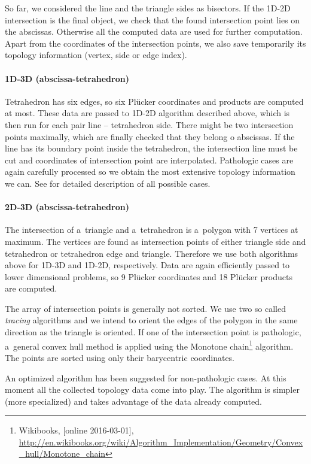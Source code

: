 \documentclass[FM,Dis]{tulthesis}
\begin{document}
So far, we considered the line and the triangle sides as bisectors. If the 1D-2D intersection is the final object,
we check that the found intersection point lies on the abscissas. Otherwise all the computed data are used for 
further computation. Apart from the coordinates of the intersection points, we also save temporarily its topology
information (vertex, side or edge index).

\paragraph{1D-3D (abscissa-tetrahedron)}
Tetrahedron has six edges, so six Pl\"{u}cker coordinates and products are computed at most. These data are
passed to 1D-2D algorithm described above, which is then run for each pair line -- tetrahedron side. 
There might be two intersection points maximally, which are finally checked that they belong o abscissas.
If the line has its boundary point inside the tetrahedron, the intersection line must be cut
and coordinates of intersection point are interpolated.
Pathologic cases are again carefully processed so we obtain the most extensive topology information we can.
See \cite{fris_dp_2015} for detailed description of all possible cases.

\paragraph{2D-3D (abscissa-tetrahedron)}
The intersection of a~triangle and a~tetrahedron is a~polygon with 7 vertices at maximum. The vertices
are found as intersection points of either triangle side and tetrahedron or tetrahedron edge and triangle.
Therefore we use both algorithms above for 1D-3D and 1D-2D, respectively. Data are again efficiently passed
to lower dimensional problems, so 9 Pl\"{u}cker coordinates and 18 Pl\"{u}cker products are computed. 

The array of intersection points is generally not sorted. We use two so called \emph{tracing} algorithms and we
intend to orient the edges of the polygon in the same direction as the triangle is oriented.
If one of the intersection point is pathologic, a~general convex hull method is applied using the Monotone 
chain\footnote{Wikibooks, [online 2016-03-01], 
      \url{http://en.wikibooks.org/wiki/Algorithm_Implementation/Geometry/Convex_hull/Monotone_chain}} 
algorithm. The points are sorted using only their barycentric coordinates.

An optimized algorithm has been suggested for non-pathologic cases. At this moment all the collected topology 
data come into play. The algorithm is simpler (more specialized) and takes advantage of the data already computed.
\end{document}
